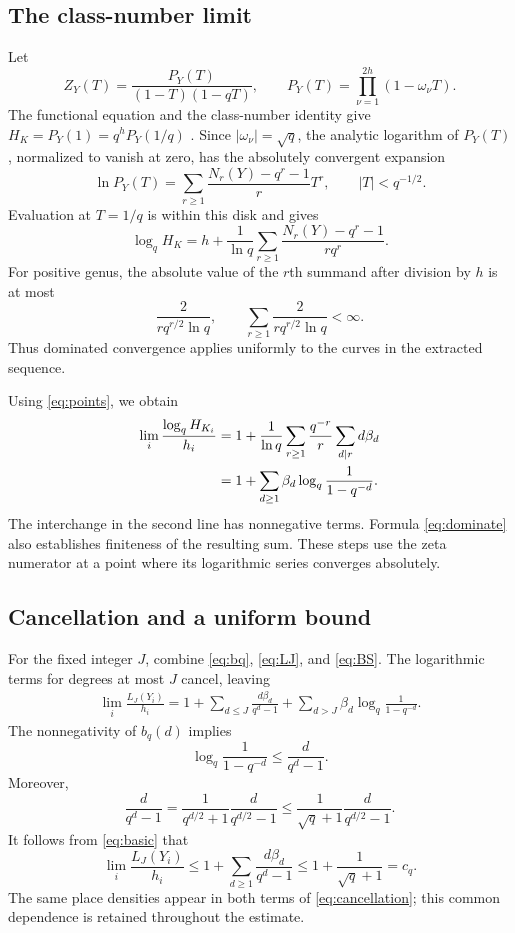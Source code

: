 \documentclass[12pt,onecolumn,draftclsnofoot,letterpaper]{IEEEtran}
\theoremstyle{remark}
\begin{document}
\subsection{The class-number limit}
Let
\[
 Z_Y(T)=\frac{P_Y(T)}{(1-T)(1-qT)},\qquad
 P_Y(T)=\prod_{\nu=1}^{2h}(1-\omega_\nu T).
\]
The functional equation and the class-number identity give
$H_K=P_Y(1)=q^hP_Y(1/q)$ \cite[Ch.~5]{stichtenoth}. Since
$|\omega_\nu|=\sqrt q$, the analytic logarithm of $P_Y(T)$, normalized to vanish at zero, has the absolutely convergent expansion
\[
 \ln P_Y(T)=\sum_{r\ge1}\frac{N_r(Y)-q^r-1}{r}T^r,
 \qquad |T|<q^{-1/2}.
\]
Evaluation at $T=1/q$ is within this disk and gives
\begin{equation}
 \log_qH_K=h+
 \frac1{\ln q}\sum_{r\ge1}
      \frac{N_r(Y)-q^r-1}{r q^r}.
 \label{eq:classseries}
\end{equation}
For positive genus, the absolute value of the $r$th summand after division by $h$ is at most
\begin{equation}
 \frac{2}{r q^{r/2}\ln q},\qquad
 \sum_{r\ge1}\frac{2}{r q^{r/2}\ln q}<\infty.
 \label{eq:dominate}
\end{equation}
Thus dominated convergence applies uniformly to the curves in the extracted sequence.

Using \eqref{eq:points}, we obtain
\begin{align}
 \lim_i\frac{\log_qH_{K_i}}{h_i}
 &=1+\frac1{\ln q}\sum_{r\ge1}\frac{q^{-r}}r
                    \sum_{d\mid r}d\beta_d\notag\\
 &=1+\sum_{d\ge1}\beta_d\log_q\frac1{1-q^{-d}}.
 \label{eq:BS}
\end{align}
The interchange in the second line has nonnegative terms. Formula \eqref{eq:dominate} also establishes finiteness of the resulting sum. These steps use the zeta numerator at a point where its logarithmic series converges absolutely.

\subsection{Cancellation and a uniform bound}
For the fixed integer $J$, combine \eqref{eq:bq}, \eqref{eq:LJ}, and \eqref{eq:BS}. The logarithmic terms for degrees at most $J$ cancel, leaving
\begin{align}
 \lim_i\frac{L_J(Y_i)}{h_i}
 =1+\sum_{d\le J}\frac{d\beta_d}{q^d-1}
   +\sum_{d>J}\beta_d\log_q\frac1{1-q^{-d}}.
 \label{eq:cancellation}
\end{align}
The nonnegativity of $b_q(d)$ implies
\[
 \log_q\frac1{1-q^{-d}}\le\frac d{q^d-1}.
\]
Moreover,
\begin{equation}
 \frac d{q^d-1}
 =\frac1{q^{d/2}+1}\frac d{q^{d/2}-1}
 \le\frac1{\sqrt q+1}\frac d{q^{d/2}-1}.
 \label{eq:weights}
\end{equation}
It follows from \eqref{eq:basic} that
\begin{equation}
 \lim_i\frac{L_J(Y_i)}{h_i}
 \le1+\sum_{d\ge1}\frac{d\beta_d}{q^d-1}
 \le1+\frac1{\sqrt q+1}=c_q.
 \label{eq:limitjoint}
\end{equation}
The same place densities appear in both terms of \eqref{eq:cancellation}; this common dependence is retained throughout the estimate.
\end{document}
